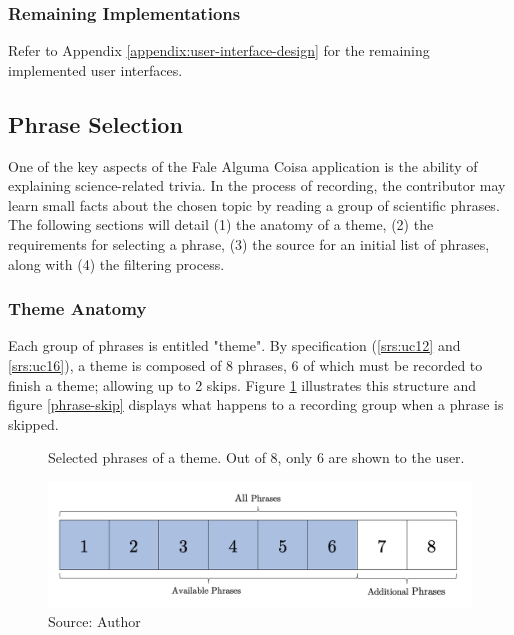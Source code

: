 \subsubsection{Remaining Implementations}

Refer to Appendix \ref{appendix:user-interface-design} for the remaining implemented user interfaces.

\clearpage
\subsection{Phrase Selection}
\label{sec:app-phrase-selection}

One of the key aspects of the Fale Alguma Coisa application is the ability of explaining science-related trivia. In the process of recording, the contributor may learn small facts about the chosen topic by reading a group of scientific phrases. The following sections will detail (1) the anatomy of a theme, (2) the requirements for selecting a phrase, (3) the source for an initial list of phrases, along with (4) the filtering process.

\subsubsection{Theme Anatomy}

Each group of phrases is entitled "theme". By specification (\ref{srs:uc12} and \ref{srs:uc16}), a theme is composed of 8 phrases, 6 of which must be recorded to finish a theme; allowing up to 2 skips. Figure \ref{fig:falealgumacoisa-phrase-all} illustrates this structure and figure \ref{phrase-skip} displays what happens to a recording group when a phrase is skipped.

\begin{figure}[h]
    \centering
    \caption{Selected phrases of a theme. Out of 8, only 6 are shown to the user.}
    \includegraphics[width=\linewidth]{images/sw-req-spec/phrase-all.png}
    \caption*{Source: Author}
    \label{fig:falealgumacoisa-phrase-all}
\end{figure}

